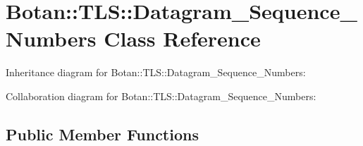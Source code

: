 \hypertarget{class_botan_1_1_t_l_s_1_1_datagram___sequence___numbers}{}\section{Botan\+:\+:T\+LS\+:\+:Datagram\+\_\+\+Sequence\+\_\+\+Numbers Class Reference}
\label{class_botan_1_1_t_l_s_1_1_datagram___sequence___numbers}


Inheritance diagram for Botan\+:\+:T\+LS\+:\+:Datagram\+\_\+\+Sequence\+\_\+\+Numbers\+:


Collaboration diagram for Botan\+:\+:T\+LS\+:\+:Datagram\+\_\+\+Sequence\+\_\+\+Numbers\+:
\subsection*{Public Member Functions}
